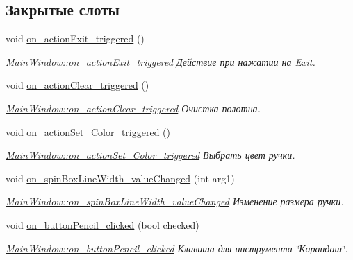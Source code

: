 \subsection*{Закрытые слоты}
\begin{DoxyCompactItemize}
\item 
void \hyperlink{class_main_window_ab4487c4b02224acd4a0193d38b704ddb}{on\+\_\+action\+Exit\+\_\+triggered} ()
\begin{DoxyCompactList}\small\item\em \hyperlink{class_main_window_ab4487c4b02224acd4a0193d38b704ddb}{Main\+Window\+::on\+\_\+action\+Exit\+\_\+triggered} Действие при нажатии на Exit. \end{DoxyCompactList}\item 
void \hyperlink{class_main_window_a7add49b8afd676505acef34d5483c576}{on\+\_\+action\+Clear\+\_\+triggered} ()
\begin{DoxyCompactList}\small\item\em \hyperlink{class_main_window_a7add49b8afd676505acef34d5483c576}{Main\+Window\+::on\+\_\+action\+Clear\+\_\+triggered} Очистка полотна. \end{DoxyCompactList}\item 
void \hyperlink{class_main_window_ad34e6ed9fb10f0b3672b3d642930ff8c}{on\+\_\+action\+Set\+\_\+\+Color\+\_\+triggered} ()
\begin{DoxyCompactList}\small\item\em \hyperlink{class_main_window_ad34e6ed9fb10f0b3672b3d642930ff8c}{Main\+Window\+::on\+\_\+action\+Set\+\_\+\+Color\+\_\+triggered} Выбрать цвет ручки. \end{DoxyCompactList}\item 
void \hyperlink{class_main_window_a543d9229c9505b042a250aaeebb48385}{on\+\_\+spin\+Box\+Line\+Width\+\_\+value\+Changed} (int arg1)
\begin{DoxyCompactList}\small\item\em \hyperlink{class_main_window_a543d9229c9505b042a250aaeebb48385}{Main\+Window\+::on\+\_\+spin\+Box\+Line\+Width\+\_\+value\+Changed} Изменение размера ручки. \end{DoxyCompactList}\item 
void \hyperlink{class_main_window_ac32e6173b0d1047aec96c7692090495a}{on\+\_\+button\+Pencil\+\_\+clicked} (bool checked)
\begin{DoxyCompactList}\small\item\em \hyperlink{class_main_window_ac32e6173b0d1047aec96c7692090495a}{Main\+Window\+::on\+\_\+button\+Pencil\+\_\+clicked} Клавиша для инструмента \char`\"{}Карандаш\char`\"{}. \end{DoxyCompactList}\item 

\end{DoxyCompactItemize}
